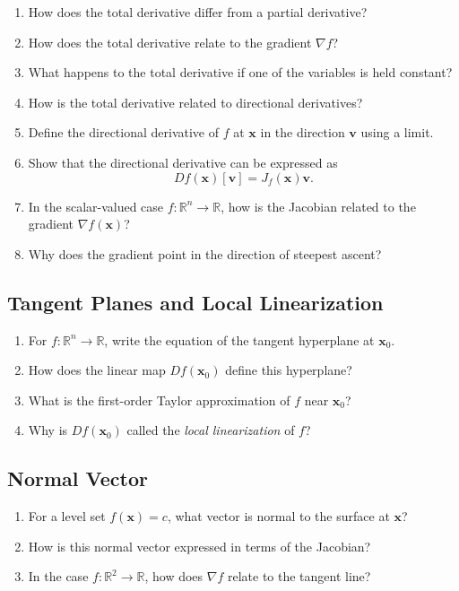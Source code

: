 \begin{enumerate}[resume]
  \item How does the total derivative differ from a partial derivative?
  \item How does the total derivative relate to the gradient $\nabla f$?
  \item What happens to the total derivative if one of the variables is held constant?
  \item How is the total derivative related to directional derivatives?
  \item Define the directional derivative of $f$ at $\mathbf{x}$ in the direction $\mathbf{v}$ using a limit.
  \item Show that the directional derivative can be expressed as
    \[
      Df(\mathbf{x})[\mathbf{v}] = J_f(\mathbf{x}) \mathbf{v}.
    \]
  \item In the scalar-valued case $f : \mathbb{R}^n \to \mathbb{R}$, how is the Jacobian related to the gradient $\nabla f(\mathbf{x})$?
  \item Why does the gradient point in the direction of steepest ascent?
\end{enumerate}

\subsection{Tangent Planes and Local Linearization}

\begin{enumerate}[resume]
  \item For $f : \mathbb{R}^n \to \mathbb{R}$, write the equation of the tangent hyperplane at $\mathbf{x}_0$.
  \item How does the linear map $Df(\mathbf{x}_0)$ define this hyperplane?
  \item What is the first-order Taylor approximation of $f$ near $\mathbf{x}_0$?
  \item Why is $Df(\mathbf{x}_0)$ called the \emph{local linearization} of $f$?
\end{enumerate}

\subsection{Normal Vector}

\begin{enumerate}[resume]
  \item For a level set $f(\mathbf{x}) = c$, what vector is normal to the surface at $\mathbf{x}$?
  \item How is this normal vector expressed in terms of the Jacobian?
  \item In the case $f : \mathbb{R}^2 \to \mathbb{R}$, how does $\nabla f$ relate to the tangent line?
\end{enumerate}

